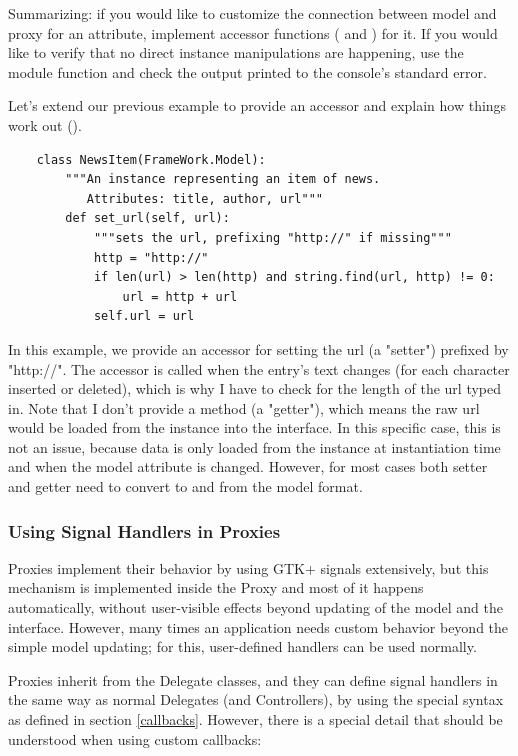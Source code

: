\documentclass[a4paper]{howto}
\begin{document}
Summarizing: if you would like to customize the connection between model
and proxy for an attribute, implement accessor functions
( and ) for it. If you would like to
verify that no direct instance manipulations are happening, use the
module function  and check the output
printed to the console's standard error.

Let's extend our previous example to provide an accessor and explain how
things work out ().

\begin{verbatim}
    class NewsItem(FrameWork.Model):
        """An instance representing an item of news.
           Attributes: title, author, url"""
        def set_url(self, url):
            """sets the url, prefixing "http://" if missing"""
            http = "http://"
            if len(url) > len(http) and string.find(url, http) != 0:
                url = http + url
            self.url = url
\end{verbatim}

In this example, we provide an accessor for setting the url (a "setter")
prefixed by "http://". The accessor is called when the entry's text
changes (for each character inserted or deleted), which is why I have to
check for the length of the url typed in. Note that I don't provide a
 method (a "getter"), which means the raw url would be
loaded from the instance into the interface. In this specific case, this
is not an issue, because data is only loaded from the instance at
instantiation time and when the model attribute is changed. However, for
most cases both setter and getter need to convert to and from the model
format.

\subsubsection{Using Signal Handlers in Proxies}

Proxies implement their behavior by using GTK+ signals extensively, but
this mechanism is implemented inside the Proxy and most of it happens
automatically, without user-visible effects beyond updating of the model
and the interface. However, many times an application needs custom
behavior beyond the simple model updating; for this, user-defined
handlers can be used normally.

Proxies inherit from the Delegate classes, and they can define signal
handlers in the same way as normal Delegates (and Controllers), by using
the special syntax as defined in section \ref{callbacks}. However, there
is a special detail that should be understood when using custom
callbacks:
\end{document}
